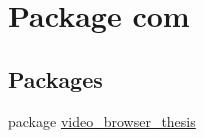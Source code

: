 \hypertarget{namespacecom}{\section{Package com}
\label{namespacecom}
}
\subsection*{Packages}
\begin{DoxyCompactItemize}
\item 
package \hyperlink{namespacecom_1_1video__browser__thesis}{video\-\_\-browser\-\_\-thesis}
\end{DoxyCompactItemize}

